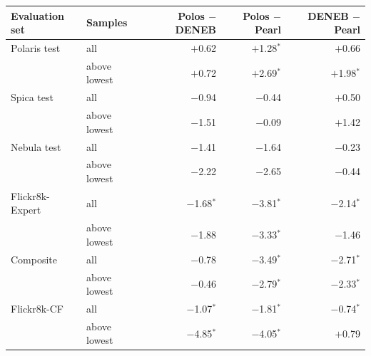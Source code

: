 \begin{tabular}{llrrr}
\toprule
Evaluation set & Samples & Polos $-$ DENEB & Polos $-$ Pearl & DENEB $-$ Pearl \\
\midrule
Polaris test & all & $+$0.62 & $+$1.28$^{*}$ & $+$0.66 \\
 & above lowest & $+$0.72 & $+$2.69$^{*}$ & $+$1.98$^{*}$ \\
Spica test & all & $-$0.94 & $-$0.44 & $+$0.50 \\
 & above lowest & $-$1.51 & $-$0.09 & $+$1.42 \\
Nebula test & all & $-$1.41 & $-$1.64 & $-$0.23 \\
 & above lowest & $-$2.22 & $-$2.65 & $-$0.44 \\
Flickr8k-Expert & all & $-$1.68$^{*}$ & $-$3.81$^{*}$ & $-$2.14$^{*}$ \\
 & above lowest & $-$1.88 & $-$3.33$^{*}$ & $-$1.46 \\
Composite & all & $-$0.78 & $-$3.49$^{*}$ & $-$2.71$^{*}$ \\
 & above lowest & $-$0.46 & $-$2.79$^{*}$ & $-$2.33$^{*}$ \\
Flickr8k-CF & all & $-$1.07$^{*}$ & $-$1.81$^{*}$ & $-$0.74$^{*}$ \\
 & above lowest & $-$4.85$^{*}$ & $-$4.05$^{*}$ & $+$0.79 \\
\bottomrule
\end{tabular}
